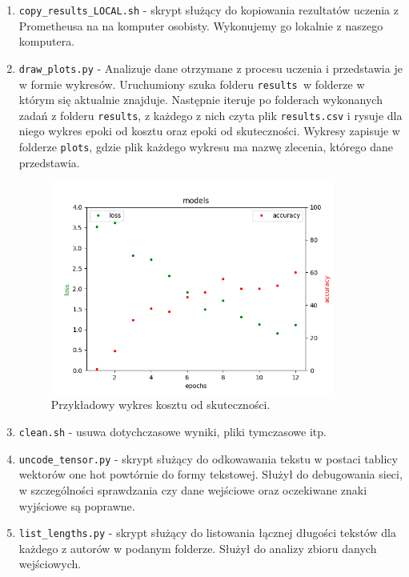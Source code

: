 \begin{enumerate}
	\item {\texttt{copy\_results\_LOCAL.sh} } - skrypt służący do kopiowania rezultatów uczenia z Prometheusa na 
	na komputer osobisty. Wykonujemy go lokalnie z naszego komputera. 

	\item {\texttt{draw\_plots.py} } - Analizuje dane otrzymane z procesu uczenia i przedstawia je w formie wykresów.
	Uruchumiony szuka folderu \texttt{results }w folderze w którym się aktualnie znajduje. Następnie iteruje po folderach
	wykonanych zadań z folderu \texttt{results}, z każdego z nich czyta plik \texttt{results.csv} i rysuje dla niego wykres epoki od kosztu
 	oraz epoki od skuteczności. Wykresy zapisuje w folderze \texttt{plots}, gdzie plik każdego wykresu ma nazwę 
 	zlecenia, którego dane przedstawia.
 	 
 	\begin{figure}[H]
	\centering
	\includegraphics[height=7cm]{./images/plot.png}
	\caption{Przykładowy wykres kosztu od skuteczności.}
	\label{fig:test5}
	\end{figure}
 	
	
	\item {\texttt{clean.sh} } - usuwa dotychczasowe wyniki, pliki tymczasowe itp.
	
	\item {\texttt{uncode\_tensor.py} } - skrypt służący do odkowawania tekstu w postaci tablicy wektorów one hot powtórnie do 
 	formy tekstowej. Służył do debugowania sieci, w szczególności sprawdzania czy dane wejściowe oraz 
 	oczekiwane znaki wyjściowe są poprawne.
 	
 	\item {\texttt{list\_lengths.py} } - skrypt służący do listowania łącznej długości tekstów dla każdego z autorów
 	w podanym folderze. Służył do analizy zbioru danych wejściowych.
	
	
	
\end{enumerate}



